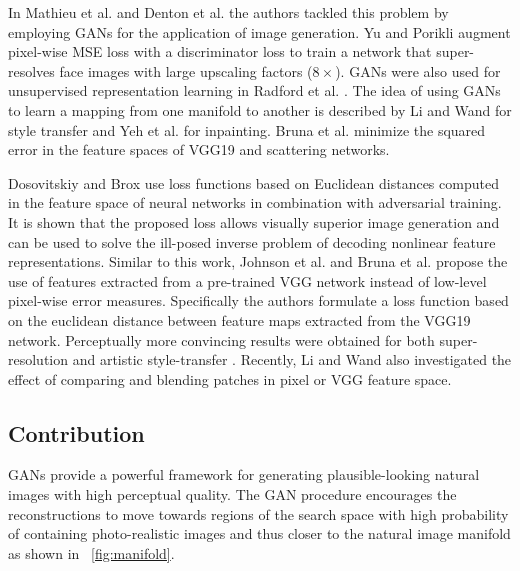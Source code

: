 \documentclass[10pt,twocolumn,letterpaper]{article}
\begin{document}
	In Mathieu et al. \cite{Mathieu2015} and Denton et al. \cite{Denton2015} the authors tackled this problem by employing \acp{GAN} \cite{Goodfellow14GAN} for the application of image generation. Yu and Porikli \cite{yu2016ultra} augment pixel-wise \ac{MSE} loss with a discriminator loss to train a network that super-resolves face images with large upscaling factors ($8\times$). \acp{GAN} were also used for unsupervised representation learning in Radford et al. \cite{Radford2015}.
	The idea of using \acp{GAN} to learn a mapping from one manifold to another is described by Li and Wand \cite{Li2016} for style transfer and Yeh et al. \cite{Yeh2016} for inpainting.
	Bruna et al. \cite{bruna2016super} minimize the squared error in the feature spaces of VGG19 \cite{simonyan2014very} and scattering networks.
	
	Dosovitskiy and Brox \cite{dosovitskiy2016generating} use loss functions based on Euclidean distances computed in the feature space of neural networks in combination with adversarial training. It is shown that the proposed loss allows visually superior image generation and can be used to solve the ill-posed inverse problem of decoding nonlinear feature representations.
	Similar to this work, Johnson et al. \cite{Johnson16PercepLoss} and Bruna et al. \cite{bruna2016super} propose the use of features extracted from a pre-trained VGG network instead of low-level pixel-wise error measures. Specifically the authors formulate a loss function based on the euclidean distance between feature maps extracted from the VGG19 \cite{simonyan2014very} network. Perceptually more convincing results were obtained for both super-resolution and artistic style-transfer \cite{Gatys2015nips,Gatys2016cvpr}. Recently, Li and Wand \cite{Li2016} also investigated the effect of comparing and blending patches in pixel or VGG feature space.

\subsection{Contribution}
	\acp{GAN} provide a powerful framework for generating plausible-looking natural images with high perceptual quality. 
	The \ac{GAN} procedure encourages the reconstructions to move towards regions of the search space with high probability of containing photo-realistic images and thus closer to the natural image manifold as shown in \figurename~\ref{fig:manifold}.
\end{document}
